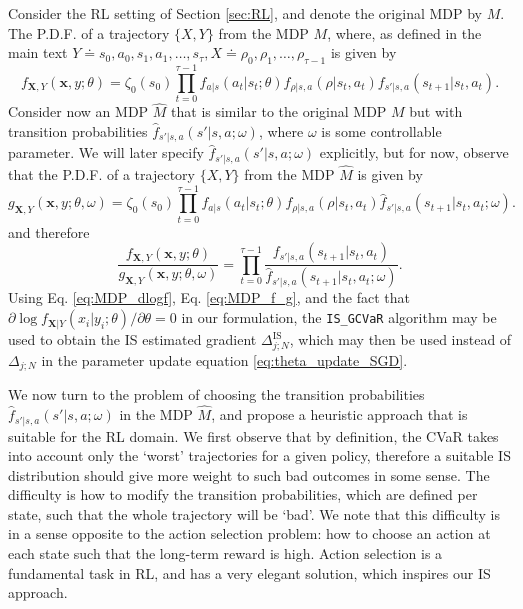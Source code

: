 \documentclass[letterpaper]{article}
\newcommand{\bx}{\mathbf{x}}
\newcommand{\bX}{\mathbf{X}}
\newcommand{\is}{\textrm{IS}}
\newcommand{\dcvar}{\Delta_{j;N}} %
\newcommand{\dcvarIS}{\Delta_{j;N}^{\is}} %
\begin{document}
Consider the RL setting of Section \ref{sec:RL}, and denote the original MDP by $M$. The P.D.F. of a trajectory $\{X,Y\}$ from the MDP $M$, where, as defined in the main text $Y \doteq s_0,a_0,s_1,a_1,\dots,s_\tau, X \doteq \rho_0,\rho_1,\dots,\rho_{\tau-1}$ is given by
\begin{equation*}
f_{\bX,Y}(\bx,y;\theta) =
\zeta_0(s_0) \prod_{t=0}^{\tau-1} f_{a|s}(a_t|s_t;\theta) f_{\rho|s,a} (\rho|s_t,a_t) f_{s'|s,a}(s_{t+1}|s_t,a_t).
\end{equation*}
Consider now an MDP $\hat{M}$ that is similar to the original MDP $M$ but with transition probabilities $\hat{f}_{s'|s,a}(s'|s,a;\omega)$, where $\omega$ is some controllable parameter. We will later specify $\hat{f}_{s'|s,a}(s'|s,a;\omega)$ explicitly, but for now, observe that the P.D.F. of a trajectory $\{X,Y\}$ from the MDP $\hat{M}$ is given by
\begin{equation*}
g_{\bX,Y}(\bx,y;\theta,\omega) =
\zeta_0(s_0) \prod_{t=0}^{\tau-1} f_{a|s}(a_t|s_t;\theta) f_{\rho|s,a} (\rho|s_t,a_t) \hat{f}_{s'|s,a}(s_{t+1}|s_t,a_t;\omega).
\end{equation*}
and therefore
\begin{equation}\label{eq:MDP_f_g}
\frac{f_{\bX,Y}(\bx,y;\theta)}{g_{\bX,Y}(\bx,y;\theta,\omega)} = \prod_{t=0}^{\tau-1} \frac{f_{s'|s,a}(s_{t+1}|s_t,a_t)}{\hat{f}_{s'|s,a}(s_{t+1}|s_t,a_t;\omega)}.
\end{equation}
Using Eq. \eqref{eq:MDP_dlogf}, Eq. \eqref{eq:MDP_f_g}, and the fact that $\partial \log f_{\bX|Y}\left(x_{i}|y_i;\theta\right) \!/\! \partial \theta\!=\!0$ in our formulation, the \texttt{IS\_GCVaR} algorithm may be used to obtain the IS estimated gradient $\dcvarIS$, which may then be used instead of $\dcvar$ in the parameter update equation \eqref{eq:theta_update_SGD}.

We now turn to the problem of choosing the transition probabilities $\hat{f}_{s'|s,a}(s'|s,a;\omega)$ in the MDP $\hat{M}$, and propose a heuristic approach that is suitable for the RL domain. We first observe that by definition, the CVaR takes into account only the `worst' trajectories for a given policy, therefore a suitable IS distribution should give more weight to such bad outcomes in some sense. The difficulty is how to modify the transition probabilities, which are defined per state, such that the whole trajectory will be `bad'.
We note that this difficulty is in a sense opposite to the action selection problem: how to choose an action at each state such that the long-term reward is high. Action selection is a fundamental task in RL, and has a very elegant solution, which inspires our IS approach.
\end{document}
